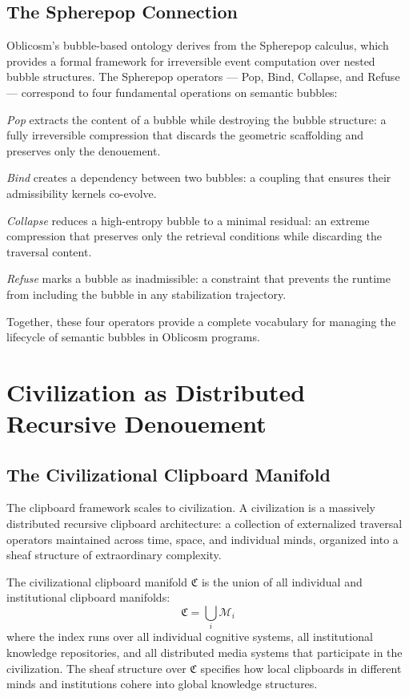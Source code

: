 \documentclass[12pt,oneside]{book}
\theoremstyle{plain}
\theoremstyle{definition}
\theoremstyle{plain}
\newcommand{\cM}{\mathcal{M}}
\newcommand{\fC}{\mathfrak{C}}
\begin{document}
\section{The Spherepop Connection}

Oblicosm's bubble-based ontology derives from the Spherepop calculus, which provides a formal framework for irreversible event computation over nested bubble structures. The Spherepop operators --- Pop, Bind, Collapse, and Refuse --- correspond to four fundamental operations on semantic bubbles:

\emph{Pop} extracts the content of a bubble while destroying the bubble structure: a fully irreversible compression that discards the geometric scaffolding and preserves only the denouement.

\emph{Bind} creates a dependency between two bubbles: a coupling that ensures their admissibility kernels co-evolve.

\emph{Collapse} reduces a high-entropy bubble to a minimal residual: an extreme compression that preserves only the retrieval conditions while discarding the traversal content.

\emph{Refuse} marks a bubble as inadmissible: a constraint that prevents the runtime from including the bubble in any stabilization trajectory.

Together, these four operators provide a complete vocabulary for managing the lifecycle of semantic bubbles in Oblicosm programs.

\chapter{Civilization as Distributed Recursive Denouement}
\label{ch:civilization}

\section{The Civilizational Clipboard Manifold}

The clipboard framework scales to civilization. A civilization is a massively distributed recursive clipboard architecture: a collection of externalized traversal operators maintained across time, space, and individual minds, organized into a sheaf structure of extraordinary complexity.

The civilizational clipboard manifold $\fC$ is the union of all individual and institutional clipboard manifolds:
\[
\fC = \bigcup_i \cM_i
\]
where the index runs over all individual cognitive systems, all institutional knowledge repositories, and all distributed media systems that participate in the civilization. The sheaf structure over $\fC$ specifies how local clipboards in different minds and institutions cohere into global knowledge structures.
\end{document}
